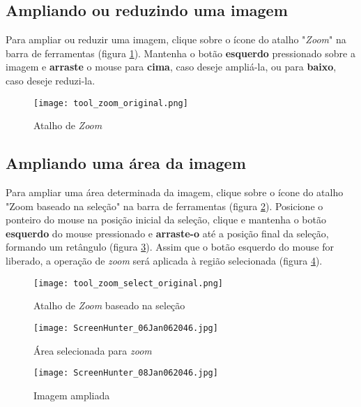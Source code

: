 \subsection{Ampliando ou reduzindo uma imagem}

Para ampliar ou reduzir uma imagem, clique sobre o ícone do atalho "\textit{Zoom}" na barra de
ferramentas (figura \ref{fig:zoom_icon}). Mantenha o botão \textbf{esquerdo} pressionado sobre
a imagem e \textbf{arraste} o mouse para \textbf{cima}, caso deseje ampliá-la, ou para \textbf{baixo},
caso deseje reduzi-la.

\begin{figure}[!htb]
\centering
\texttt{[image: tool\_zoom\_original.png]}
\caption{Atalho de \textit{Zoom}}
\label{fig:zoom_icon}
\end{figure}


\subsection{Ampliando uma área da imagem}

Para ampliar uma área determinada da imagem, clique sobre o ícone do atalho "Zoom baseado na seleção" 
na barra de ferramentas (figura \ref{fig:zoom_icon_loc}). Posicione o ponteiro do mouse na posição
inicial da seleção, clique e mantenha o botão \textbf{esquerdo} do mouse pressionado e \textbf{arraste-o}
até a posição final da seleção, formando um retângulo (figura \ref{fig:zoom_select}). Assim que o
botão esquerdo do mouse for liberado, a operação de \textit{zoom} será aplicada à região selecionada
(figura \ref{fig:zoom_applied}).

\begin{figure}[!htb]
\centering
\texttt{[image: tool\_zoom\_select\_original.png]}
\caption{Atalho de \textit{Zoom} baseado na seleção}
\label{fig:zoom_icon_loc}
\end{figure}

\begin{figure}[!htb]
\centering
\texttt{[image: ScreenHunter\_06Jan062046.jpg]}
\caption{Área selecionada para \textit{zoom}}
\label{fig:zoom_select}
\end{figure}

\begin{figure}[!htb]
\centering
\texttt{[image: ScreenHunter\_08Jan062046.jpg]}
\caption{Imagem ampliada}
\label{fig:zoom_applied}
\end{figure}


